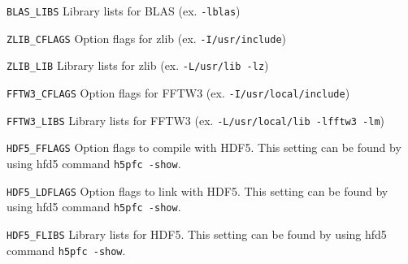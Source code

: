 \begin{description}
\item{\verb|BLAS_LIBS|} Library lists for BLAS  (ex.  \verb|-lblas|)
\item{\verb|ZLIB_CFLAGS|} Option flags for zlib  (ex.  \verb|-I/usr/include|)
\item{\verb|ZLIB_LIB|}   Library lists for zlib (ex. \verb|-L/usr/lib -lz|)
\item{\verb|FFTW3_CFLAGS|} Option flags for FFTW3  (ex.  \verb|-I/usr/local/include|)
\item{\verb|FFTW3_LIBS|}   Library lists for FFTW3 (ex. \verb|-L/usr/local/lib -lfftw3 -lm|)
\item{\verb|HDF5_FFLAGS|}  Option flags to compile with HDF5. This setting can be found by using hfd5 command \verb|h5pfc -show|.

\item{\verb|HDF5_LDFLAGS|}    Option flags  to link with  HDF5. This setting can be found by using hfd5 command \verb|h5pfc -show|.

\item{\verb|HDF5_FLIBS|}   Library lists for HDF5. This setting can be found by using hfd5 command \verb|h5pfc -show|.

\end{description}
%


